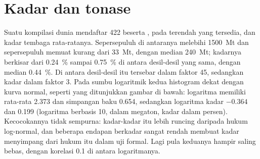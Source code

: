 \section{Kadar dan tonase}\label{sec:b2:ore-deposits:grade-tonnage}

Suatu kompilasi dunia mendaftar 422  beserta , pada  terendah
yang tersedia, dan kadar tembaga rata-ratanya. Sepersepuluh di antaranya melebihi \qty{1500}{Mt} dan sepersepuluh memuat kurang
dari \qty{33}{Mt}, dengan median \qty{240}{Mt}; kadarnya berkisar dari \qty{0.24}{\percent} sampai
\qty{0.75}{\percent} di antara desil-desil yang sama, dengan median \qty{0.44}{\percent}. Di antara
desil-desil itu  tersebar dalam faktor 45, sedangkan kadar dalam faktor 3. Pada sumbu logaritmik kedua histogram dekat dengan kurva normal, seperti yang ditunjukkan gambar di bawah:
logaritma  memiliki rata-rata 2.373 dan simpangan baku 0.654, sedangkan logaritma kadar
$-0.364$ dan 0.199 (logaritma berbasis 10,  dalam megaton, kadar dalam persen). Kecocokannya
tidak sempurna: kadar-kadar itu lebih runcing daripada hukum log-normal, dan beberapa endapan berkadar sangat rendah membuat
kadar menyimpang dari hukum itu dalam uji formal. Lagi pula keduanya hampir saling bebas, dengan korelasi
0.1 di antara logaritmanya.

